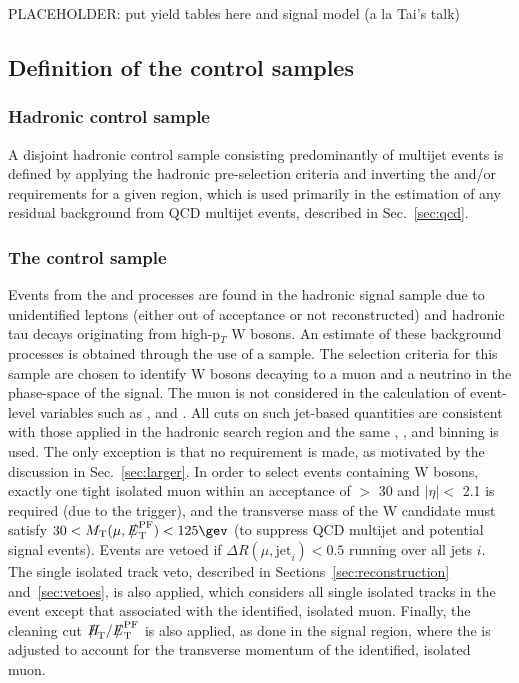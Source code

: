 PLACEHOLDER: put yield tables here and signal model (a la Tai's talk)


\subsection{Definition of the control samples}
\label{sec:controlSelection}

\subsubsection{Hadronic control sample}

A disjoint hadronic control sample consisting predominantly of
multijet events is defined by applying the hadronic pre-selection
criteria and inverting the \alphat and/or \mhtmet requirements for a
given \scalht region, which is used primarily in the estimation of any
residual background from QCD multijet events, described in
Sec.~\ref{sec:qcd}.

\subsubsection{The \texorpdfstring{\mj}{muon plus jets} control sample}

Events from the \wj and \ttbar processes are found in the hadronic
signal sample due to unidentified leptons (either out of acceptance or
not reconstructed) and hadronic tau decays originating from
high-p$_{T}$ W bosons. An estimate of these background processes is
obtained through the use of a \mj sample. The selection criteria for
this sample are chosen to identify W bosons decaying to a muon and a
neutrino in the phase-space of the signal. The muon is not considered
in the calculation of event-level variables such as \scalht, \mht and
\alphat. All cuts on such jet-based quantities are consistent with
those applied in the hadronic search region and the same \njet, \nb,
and \scalht binning is used. The only exception is that no \alphat
requirement is made, as motivated by the discussion in
Sec.~\ref{sec:larger}. In order to select events containing W bosons,
exactly one tight isolated muon within an acceptance of \PT $>$ 30
\gev and $|\eta| <$ 2.1 is required (due to the trigger), and the
transverse mass of the W candidate must satisfy $30 < \mt(\mu,\pfmet)
< 125\gev$ (to suppress QCD multijet and potential signal
events). Events are vetoed if $\Delta R(\mu,\textrm{jet}_i) < 0.5$
running over all jets $i$. The single isolated track veto, described
in Sections~\ref{sec:reconstruction} and~\ref{sec:vetoes}, is also
applied, which considers all single isolated tracks in the event
except that associated with the identified, isolated muon. Finally,
the cleaning cut $\mht/\pfmet$ is also applied, as done in the signal
region, where the \pfmet is adjusted to account for the transverse
momentum of the identified, isolated muon.

